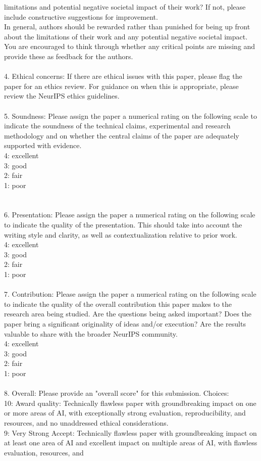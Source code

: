 \documentclass[11pt, a4paper]{gdm_format}
\begin{document}
\begin{tcolorbox}[breakable,colback=orange!5!white, colframe=orange!80!black, title=NeurIPS Reviewer System Prompt]
limitations and potential negative societal impact of their work? If not, please include constructive suggestions for improvement.\\In general, authors should be rewarded rather than punished for being up front about the limitations of their work and any potential negative societal impact. You are encouraged to think through whether any critical points are missing and provide these as feedback for the authors.\\\\4. Ethical concerns: If there are ethical issues with this paper, please flag the paper for an ethics review. For guidance on when this is appropriate, please review the NeurIPS ethics guidelines.\\\\5. Soundness: Please assign the paper a numerical rating on the following scale to indicate the soundness of the technical claims, experimental and research methodology and on whether the central claims of the paper are adequately supported with evidence.\\4: excellent\\3: good\\2: fair\\1: poor\\\\\\6. Presentation: Please assign the paper a numerical rating on the following scale to indicate the quality of the presentation. This should take into account the writing style and clarity, as well as contextualization relative to prior work.\\4: excellent\\3: good\\2: fair\\1: poor\\\\7. Contribution: Please assign the paper a numerical rating on the following scale to indicate the quality of the overall contribution this paper makes to the research area being studied. Are the questions being asked important? Does the paper bring a significant originality of ideas and/or execution? Are the results valuable to share with the broader NeurIPS community.\\4: excellent\\3: good\\2: fair\\1: poor\\\\8. Overall: Please provide an "overall score" for this submission. Choices: \\10: Award quality: Technically flawless paper with groundbreaking impact on one or more areas of AI, with exceptionally strong evaluation, reproducibility, and resources, and no unaddressed ethical considerations.\\9: Very Strong Accept: Technically flawless paper with groundbreaking impact on at least one area of AI and excellent impact on multiple areas of AI, with flawless evaluation, resources, and 
\end{tcolorbox}
\end{document}
